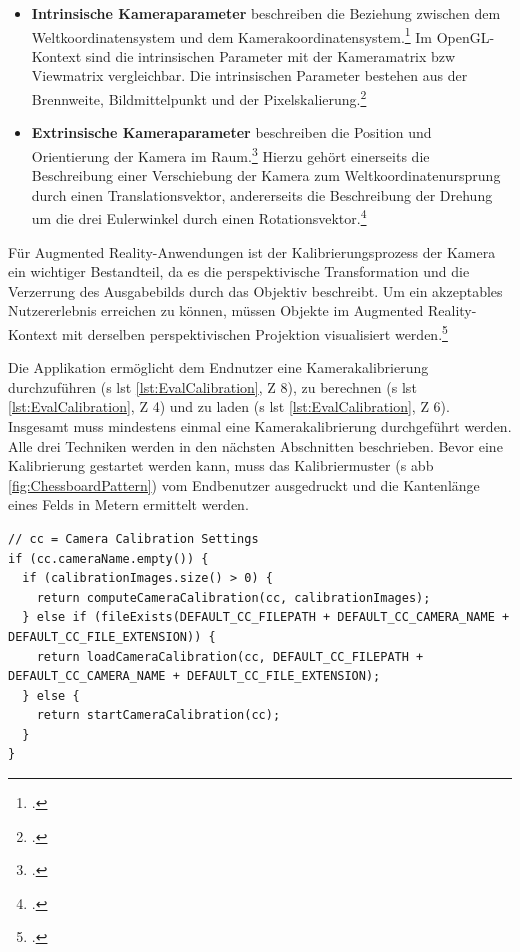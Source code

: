 \begin{itemize}
\item \textbf{Intrinsische Kameraparameter} beschreiben die Beziehung zwischen dem  Weltkoordinatensystem und dem Kamerakoordinatensystem.\footcite{Hofmann2017} Im OpenGL-Kontext sind die intrinsischen Parameter mit der Kameramatrix \acs{bzw} Viewmatrix vergleichbar. Die intrinsischen Parameter bestehen aus der Brennweite, Bildmittelpunkt und der Pixelskalierung.\footcite{Hofmann2017}
\item \textbf{Extrinsische Kameraparameter} \glqq beschreiben die Position und Orientierung der Kamera im Raum.\grqq\footcite{Hofmann2017} Hierzu gehört einerseits die Beschreibung einer Verschiebung der Kamera zum Weltkoordinatenursprung durch einen Translationsvektor, andererseits die Beschreibung der Drehung um die drei Eulerwinkel durch einen Rotationsvektor.\footcite{Hofmann2017}
\end{itemize}

\noindent Für Augmented Reality-Anwendungen ist der Kalibrierungsprozess der Kamera ein wichtiger Bestandteil, da es die perspektivische Transformation und die Verzerrung des Ausgabebilds durch das Objektiv beschreibt. Um ein akzeptables Nutzererlebnis erreichen zu können, müssen Objekte im Augmented Reality-Kontext mit derselben perspektivischen Projektion visualisiert werden.\footcite[Vgl.][\ac{S} 76]{Baggio2012}

Die Applikation ermöglicht dem Endnutzer eine Kamerakalibrierung durchzuführen (\acs{s} \acs{lst} \ref{lst:EvalCalibration}, \acs{Z} 8), zu berechnen (\acs{s} \acs{lst} \ref{lst:EvalCalibration}, \acs{Z} 4) und zu laden (\acs{s} \acs{lst} \ref{lst:EvalCalibration}, \acs{Z} 6). Insgesamt muss mindestens einmal eine Kamerakalibrierung durchgeführt werden. Alle drei Techniken werden in den nächsten Abschnitten beschrieben. Bevor eine Kalibrierung gestartet werden kann, muss das Kalibriermuster (\acs{s} \acs{abb} \ref{fig:ChessboardPattern}) vom Endbenutzer ausgedruckt und die Kantenlänge eines Felds in Metern ermittelt werden.

\begin{lstlisting}[caption={Ein Ausschnitt der Funktion \texttt{camera.cpp/initializeCamera()}, die überprüft, auf welche Art und Weise die Kamerakalibrierung durchgeführt werden soll}, label={lst:EvalCalibration}]
// cc = Camera Calibration Settings
if (cc.cameraName.empty()) {
  if (calibrationImages.size() > 0) {
    return computeCameraCalibration(cc, calibrationImages);
  } else if (fileExists(DEFAULT_CC_FILEPATH + DEFAULT_CC_CAMERA_NAME + DEFAULT_CC_FILE_EXTENSION)) {
    return loadCameraCalibration(cc, DEFAULT_CC_FILEPATH + DEFAULT_CC_CAMERA_NAME + DEFAULT_CC_FILE_EXTENSION);
  } else {
    return startCameraCalibration(cc);
  }
}
\end{lstlisting}

